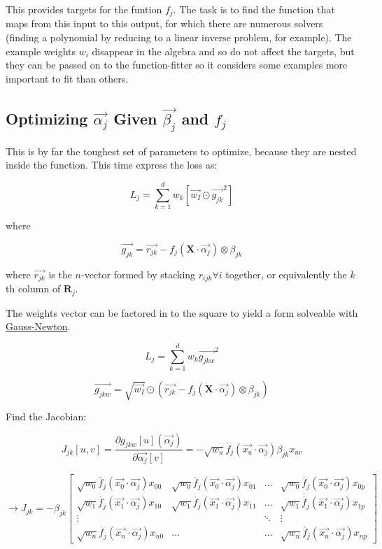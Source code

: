 \documentclass[12pt]{article}
\begin{document}
This provides targets for the funtion $f_j$. The task is to find the function that maps from this input to this output, for which there are numerous solvers (finding a polynomial by reducing to a linear inverse problem, for example). The example weights $w_i$ disappear in the algebra and so do not affect the targets, but they can be passed on to the function-fitter so it considers some examples more important to fit than others.

\subsection{Optimizing $\vec{\alpha_j}$ Given $\vec{\beta_j}$ and $f_j$}

This is by far the toughest set of parameters to optimize, because they are nested inside the function. This time express the loss as:

$$L_j = \sum_{k=1}^d w_k [\vec{w_I} \odot \vec{g_{jk}}^2]$$

where

$$ \vec{g_{jk}} = \vec{r_{jk}} - f_j(\pmb{X} \cdot \vec{\alpha_j}) \otimes \beta_{jk}$$

where $\vec{r_{jk}}$ is the $n$-vector formed by stacking $r_{ijk} \forall i$ together, or equivalently the $k$th column of $\pmb{R}_j$.

The weights vector can be factored in to the square to yield a form solveable with \href{https://en.wikipedia.org/wiki/Gauss%E2%80%93Newton_algorithm#Description}{Gauss-Newton}.

$$L_j = \sum_{k=1}^d w_k \vec{g_{jkw}}^2$$

$$\vec{g_{jkw}} = \sqrt{\vec{w_I}} \odot (\vec{r_{jk}} - f_j(\pmb{X} \cdot \vec{\alpha_j}) \otimes \beta_{jk})$$

Find the Jacobian:

$$J_{jk}[u,v] = \frac{\partial g_{jkw}[u](\vec{\alpha_j})}{\partial \vec{\alpha_j}[v]} = -\sqrt{w_u} \dot{f_j}(\vec{x_u} \cdot \vec{\alpha_j}) \beta_{jk} x_{uv}$$

\[
\rightarrow J_{jk} = -\beta_{jk}
\begin{bmatrix}
	\sqrt{w_0} \dot{f_j}(\vec{x_0} \cdot \vec{\alpha_j}) x_{00} & \sqrt{w_0} \dot{f_j}(\vec{x_0} \cdot \vec{\alpha_j}) x_{01} & \dots & \sqrt{w_0} \dot{f_j}(\vec{x_0} \cdot \vec{\alpha_j}) x_{0p} \\
    \sqrt{w_1} \dot{f_j}(\vec{x_1} \cdot \vec{\alpha_j}) x_{10} & \sqrt{w_1} \dot{f_j}(\vec{x_1} \cdot \vec{\alpha_j}) x_{11} & \dots & \sqrt{w_1} \dot{f_j}(\vec{x_1} \cdot \vec{\alpha_j}) x_{1p}\\
    \vdots & & \ddots & \vdots\\
    \sqrt{w_n} \dot{f_j}(\vec{x_n} \cdot \vec{\alpha_j}) x_{n0} & \hdots & \hdots & \sqrt{w_n} \dot{f_j}(\vec{x_n} \cdot \vec{\alpha_j}) x_{np}
\end{bmatrix}
\]
\end{document}
